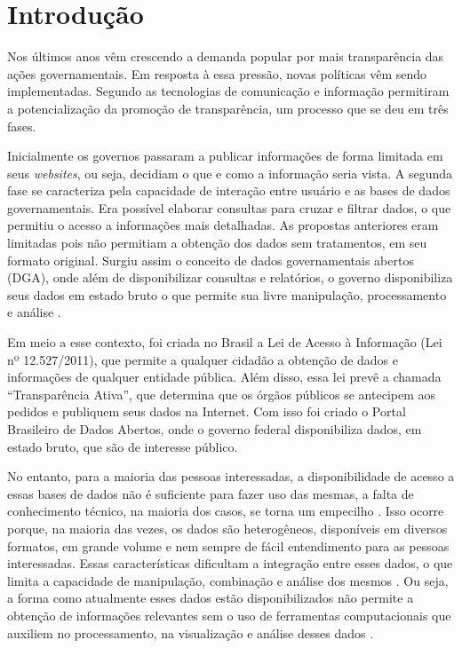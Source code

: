 
\chapter{Introdução}
\label{chap:introducao}

Nos últimos anos vêm crescendo a demanda popular por mais transparência das ações 
governamentais. Em resposta à essa pressão, novas políticas vêm sendo implementadas. 
Segundo  as tecnologias de comunicação e informação permitiram a 
potencialização da promoção de transparência, um processo que se deu em três fases. 

Inicialmente os governos passaram a publicar informações de forma limitada em seus 
\textit{websites}, ou seja, decidiam o que e como a informação seria vista. A segunda fase 
se caracteriza pela capacidade de interação entre usuário e as bases de dados governamentais. 
Era possível elaborar consultas para cruzar e filtrar dados, o que permitiu o acesso a 
informações mais detalhadas. As propostas anteriores eram limitadas pois não permitiam a 
obtenção dos dados sem tratamentos, em seu formato original. Surgiu assim o conceito de 
dados governamentais abertos (DGA), onde além de disponibilizar consultas e relatórios, o 
governo disponibiliza seus dados em estado bruto o que permite sua livre manipulação, 
processamento e análise \cite{vaz2010dados}.

Em meio a esse contexto, foi criada no Brasil a Lei de Acesso à Informação 
(Lei nº 12.527/2011), que permite a qualquer cidadão a obtenção de dados e informações 
de qualquer entidade pública. Além disso, essa lei prevê a chamada “Transparência Ativa”, 
que determina que os órgãos públicos se antecipem aos pedidos e publiquem seus dados na 
Internet. Com isso foi criado o Portal Brasileiro de Dados Abertos, onde o governo federal 
disponibiliza dados, em estado bruto, que são de interesse público. 

No entanto, para a maioria das pessoas interessadas, a disponibilidade de acesso a essas 
bases de dados não é suficiente para fazer uso das mesmas, a falta de conhecimento técnico, 
na maioria dos casos, se torna um empecilho \cite{graves2013}. Isso ocorre porque, na 
maioria das vezes, os dados são heterogêneos, disponíveis em diversos formatos, em grande 
volume e nem sempre de fácil entendimento para as pessoas interessadas. Essas características 
dificultam a integração entre esses dados, o que limita a capacidade de manipulação, 
combinação e análise dos mesmos \cite{hoxha2011open}. Ou seja, a forma como atualmente esses 
dados estão disponibilizados não permite a obtenção de informações relevantes sem o uso de 
ferramentas computacionais que auxiliem no processamento, na visualização e análise desses 
dados \cite{vaz2010dados}. 

